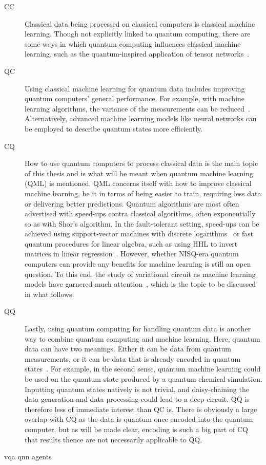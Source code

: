 \begin{description}
    \item[CC]
        Classical data being processed on classical computers is classical machine learning.
        Though not explicitly linked to quantum computing, there are some ways in which quantum computing influences classical machine learning, such as the quantum-inspired application of tensor networks~\autocite{felser2021}.

    \item[QC]
        Using classical machine learning for quantum data includes improving quantum computers' general performance.
        For example, with machine learning algorithms, the variance of the measurements can be reduced~\autocite{torlai2020}.
        Alternatively, advanced machine learning models like neural networks can be employed to describe quantum states more efficiently.


    \item[CQ]
        How to use quantum computers to process classical data is the main topic of this thesis and is what will be meant when quantum machine learning (QML) is mentioned.
        QML concerns itself with how to improve classical machine learning, be it in terms of being easier to train, requiring less data or delivering better predictions.
        Quantum algorithms are most often advertised with speed-ups contra classical algorithms, often exponentially so as with Shor's algorithm.
        In the fault-tolerant setting, speed-ups can be achieved using support-vector machines with discrete logarithms~\autocite{liu2021} or fast quantum procedures for linear algebra, such as using HHL to invert matrices in linear regression~\autocite{wiebe2012}.
        However, whether NISQ-era quantum computers can provide any benefits for machine learning is still an open question.
        To this end, the study of variational circuit as machine learning models have garnered much attention~\autocite{benedetti2019}, which is the topic to be discussed in what follows.

    \item[QQ]
        Lastly, using quantum computing for handling quantum data is another way to combine quantum computing and machine learning.
        Here, quantum data can have two meanings.
        Either it can be data from quantum measurements, or it can be data that is already encoded in quantum states~\autocite{schuld2021a}.
        For example, in the second sense, quantum machine learning could be used on the quantum state produced by a quantum chemical simulation.
        Inputting quantum states natively is not trivial, and daisy-chaining the data generation and data processing could lead to a deep circuit.
        QQ is therefore less of immediate interest than QC is.
        There is obviously a large overlap with CQ as the data is quantum once encoded into the quantum computer, but as will be made clear, encoding is such a big part of CQ that results thence are not necessarily applicable to QQ.

\end{description}


{vqa}
{qnn}
{agents}